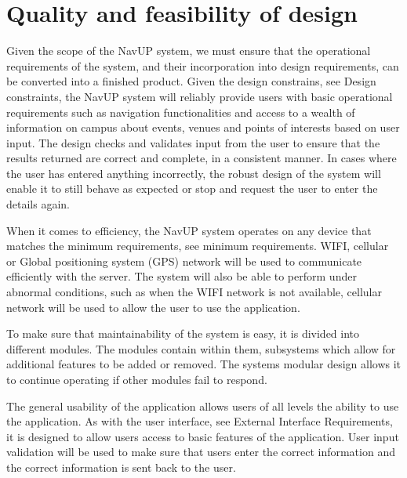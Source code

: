 \documentclass[12pt,a4paper]{article}
\begin{document}


\tableofcontents
\newpage

\section{Quality and feasibility of design}
Given the scope of the NavUP system, we must ensure that the operational requirements of the system, and their incorporation into design requirements, can be converted into a finished product. Given the design constrains, see Design constraints, the NavUP system will reliably provide users with basic operational requirements such as navigation functionalities and access to a wealth of information on campus about events, venues and points of interests based on user input. The design checks and validates input from the user to ensure that the results returned are correct and complete, in a consistent manner. In cases where the user has entered anything incorrectly, the robust design of the system will enable it to still behave as expected or stop and request the user to enter the details again. \newline

When it comes to efficiency, the NavUP system operates on any device that matches the minimum requirements, see minimum requirements. WIFI, cellular or Global positioning system (GPS) network will be used to communicate efficiently with the server. The system will also be able to perform under abnormal conditions, such as when the WIFI network is not available, cellular network will be used to allow the user to use the application. \newline

To make sure that maintainability of the system is easy, it is divided into different modules. The modules contain within them, subsystems which allow for additional features to be added or removed. The systems modular design allows it to continue operating if other modules fail to respond. \newline

The general usability of the application allows users of all levels the ability to use the application. As with the user interface, see External Interface Requirements, it is designed to allow users access to basic features of the application. User input validation will be used to make sure that users enter the correct information and the correct information is sent back to the user. \newline
\end{document}
